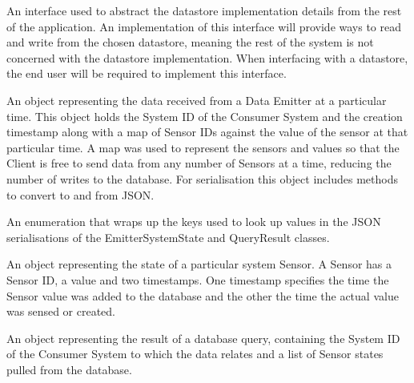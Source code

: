 \documentclass[10pt,a4paper]{article}
\begin{document}
\begin{description}[leftmargin=1cm,labelindent=1cm]
  \item [SystemDataGateway] An interface used to abstract the
    datastore implementation details from the rest of the
    application. An implementation of this interface will provide ways
    to read and write from the chosen datastore, meaning the rest of the
    system is not concerned with the datastore implementation. When
    interfacing with a datastore, the end user will be required to
    implement this interface.
  \vspace{0.2cm}
  \item [EmitterSystemState] An object representing the data received
    from a Data Emitter at a particular time. This object holds
    the System ID of the Consumer System and the creation timestamp along
    with a map of Sensor IDs against the value of the sensor at that
    particular time. A map was used to represent the sensors and
    values so that the Client is free to send data from any number of 
    Sensors at a time, reducing the number of writes to the
    database. For serialisation this object includes methods to
    convert to and from JSON.
  \vspace{0.2cm}
  \item [DataJSONAttribute] An enumeration that wraps up the keys used
    to look up values in the JSON serialisations of the
    EmitterSystemState and QueryResult classes.
  \vspace{0.2cm}
  \item [SensorState] An object representing the state of a particular
    system Sensor. A Sensor has a Sensor ID, a value and two timestamps. One
    timestamp specifies the time the Sensor value was added to the database and
    the other the time the actual value was sensed or created.
  \vspace{0.2cm}
  \item [QueryResult] An object representing the result of a database
    query, containing the System ID of the Consumer System to which the
    data relates and a list of Sensor states pulled from the database.
\end{description}
\end{document}
